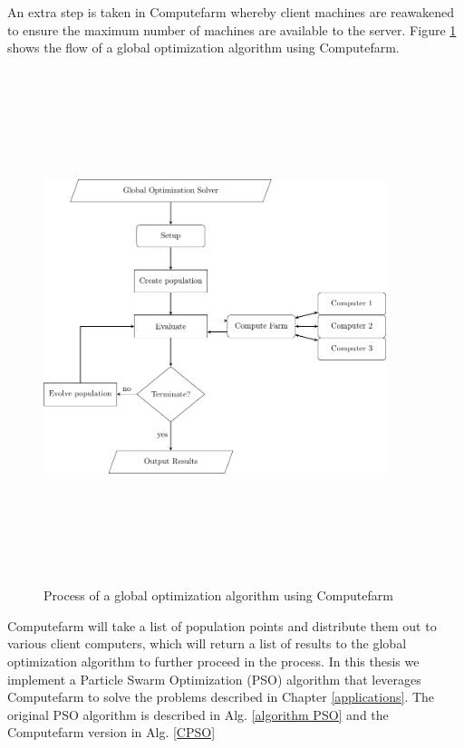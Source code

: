 An extra step is taken in Computefarm whereby client machines are reawakened to ensure the maximum number of machines are available to the server. 
  Figure \ref{fig:computefarm} shows the flow of a global optimization algorithm using Computefarm. 
\clearpage
\begin{figure}[h!]
    \centering
    \includegraphics[width=10cm,height=15cm]{chapters/chapter_3_Software/flowchart.pdf}
    \caption{Process of a global optimization algorithm using Computefarm}
    \label{fig:computefarm}
\end{figure}
Computefarm will take a list of population points and distribute them out to various client computers, which will return a list of results to the global optimization algorithm to further proceed in the process. In this thesis we implement a Particle Swarm Optimization (PSO) algorithm that leverages Computefarm to solve the problems described in Chapter \ref{applications}. The original PSO algorithm is described in Alg. \ref{algorithm PSO} and the Computefarm version in Alg. \ref{CPSO}

